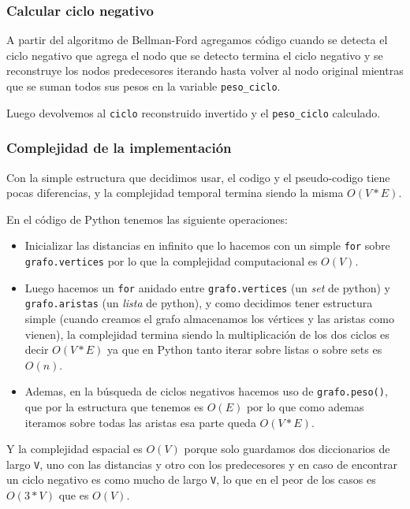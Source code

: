 \documentclass[titlepage,a4paper]{article}
\begin{document}
\subsubsection{Calcular ciclo negativo}
\label{sec:orge17a8bb}

A partir del algoritmo de Bellman-Ford agregamos código cuando se detecta el
ciclo negativo que agrega el nodo que se detecto termina el ciclo negativo y se
reconstruye los nodos predecesores iterando hasta volver al nodo original
mientras que se suman todos sus pesos en la variable \texttt{peso\_ciclo}.

Luego devolvemos al \texttt{ciclo} reconstruido invertido y el \texttt{peso\_ciclo} calculado.

\subsubsection{Complejidad de la implementación}
\label{sec:org324f57b}

Con la simple estructura que decidimos usar, el codigo y el pseudo-codigo tiene
pocas diferencias, y la complejidad temporal termina siendo la misma \(O(V * E)\).

En el código de Python tenemos las siguiente operaciones:
\begin{itemize}
\item Inicializar las distancias en infinito que lo hacemos con un simple \texttt{for}
sobre \texttt{grafo.vertices} por lo que la complejidad computacional es \(O(V)\).
\item Luego hacemos un \texttt{for} anidado entre \texttt{grafo.vertices} (un \emph{set} de python) y
\texttt{grafo.aristas} (un \emph{lista} de python), y como decidimos tener estructura
simple (cuando creamos el grafo almacenamos los vértices y las aristas como
vienen), la complejidad termina siendo la multiplicación de los dos ciclos es
decir \(O(V * E)\) ya que en Python tanto iterar sobre listas o sobre sets es
\(O(n)\).
\item Ademas, en la búsqueda de ciclos negativos hacemos uso de \texttt{grafo.peso()}, que
por la estructura que tenemos es \(O(E)\) por lo que como ademas iteramos sobre
todas las aristas esa parte queda \(O(V * E)\).
\end{itemize}

Y la complejidad espacial es \(O(V)\) porque solo guardamos dos diccionarios de
largo \texttt{V}, uno con las distancias y otro con los predecesores y en caso de
encontrar un ciclo negativo es como mucho de largo \texttt{V}, lo que en el peor de los
casos es \(O(3*V)\) que es \(O(V)\).
\end{document}
